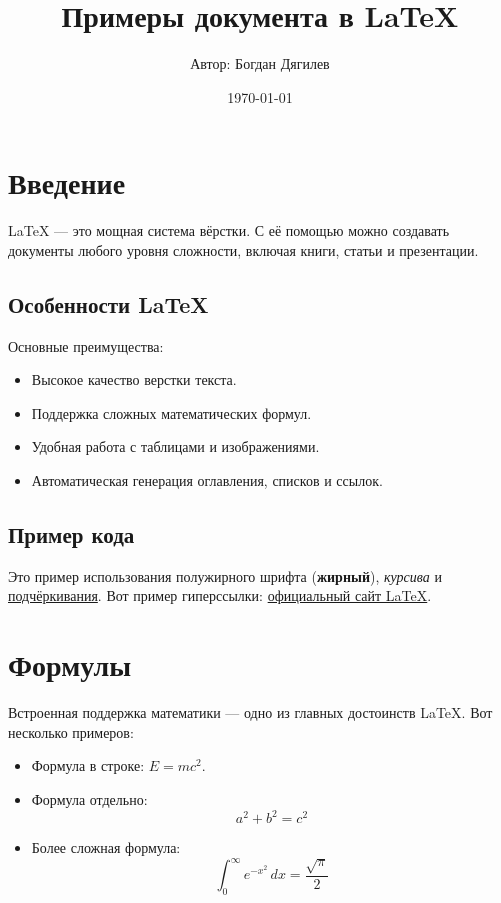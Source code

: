 \documentclass[a4paper, 12pt]{extarticle}
\title{Примеры документа в LaTeX}
\author{Автор: Богдан Дягилев}
\date{\today}
\begin{document}
\maketitle %
\tableofcontents %
\newpage

\section{Введение}
LaTeX — это мощная система вёрстки. С её помощью можно создавать документы любого уровня сложности, включая книги, статьи и презентации.

\subsection{Особенности LaTeX}

Основные преимущества:
\begin{itemize}
    \item Высокое качество верстки текста.
    \item Поддержка сложных математических формул.
    \item Удобная работа с таблицами и изображениями.
    \item Автоматическая генерация оглавления, списков и ссылок.
\end{itemize}

\subsection{Пример кода}

Это пример использования полужирного шрифта (\textbf{жирный}), \textit{курсива} и \underline{подчёркивания}. Вот пример гиперссылки: \href{https://www.latex-project.org}{официальный сайт LaTeX}.

\section{Формулы}

Встроенная поддержка математики — одно из главных достоинств LaTeX. Вот несколько примеров:
\begin{itemize}
    \item Формула в строке: \(E = mc^2\).
    \item Формула отдельно:
          \[
              a^2 + b^2 = c^2
          \]
    \item Более сложная формула:
          \[
              \int_{0}^{\infty} e^{-x^2} \, dx = \frac{\sqrt{\pi}}{2}
          \]
\end{itemize}
\end{document}
